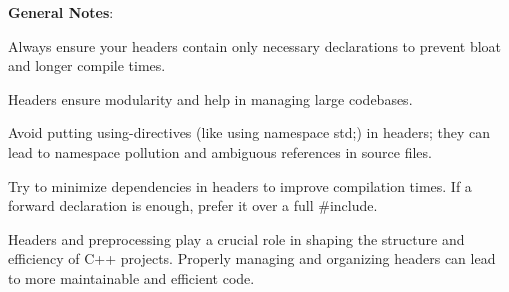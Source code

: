 {\bfseries{General Notes}}\+:


\begin{DoxyItemize}
\item Always ensure your headers contain only necessary declarations to prevent bloat and longer compile times.
\item Headers ensure modularity and help in managing large codebases.
\item Avoid putting using-\/directives (like {\ttfamily using namespace std;}) in headers; they can lead to namespace pollution and ambiguous references in source files.
\item Try to minimize dependencies in headers to improve compilation times. If a forward declaration is enough, prefer it over a full {\ttfamily \#include}.
\end{DoxyItemize}

Headers and preprocessing play a crucial role in shaping the structure and efficiency of C++ projects. Properly managing and organizing headers can lead to more maintainable and efficient code. 